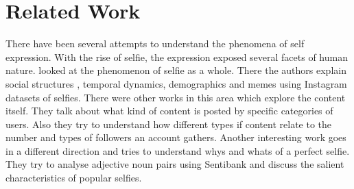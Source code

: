 \section{ Related Work }
There have been several attempts to understand the phenomena of self expression. With the rise of selfie, the expression exposed several facets of human nature. \cite{Souza2015} looked at the phenomenon of selfie as a whole. There the authors explain social structures , temporal dynamics, demographics and memes using Instagram datasets of selfies. There were other works in this area \cite{hu2014we} which explore the content itself. They talk about what kind of content is posted by specific categories of users. Also they try to understand how different types if content relate to the number and types of followers an account gathers. Another interesting work \cite{goodSelfie} goes in a different direction and tries to understand whys and whats of a perfect selfie. They try to analyse adjective noun pairs using Sentibank \cite{SentiBank} and discuss the salient characteristics of popular selfies. 
